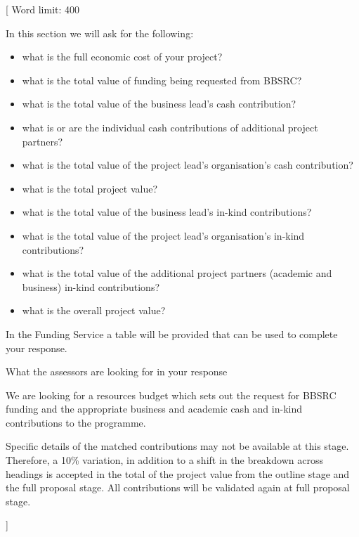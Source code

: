 \documentclass{article}
\newcommand{\desc}[1]{{\leavevmode\color{blue}[#1]}}
\begin{document}
\desc{
Word limit: 400

In this section we will ask for the following:

\begin{itemize}

    \item what is the full economic cost of your project?

    \item what is the total value of funding being requested from BBSRC?

    \item what is the total value of the business lead’s cash contribution?

    \item what is or are the individual cash contributions of additional project partners?

    \item what is the total value of the project lead’s organisation’s cash contribution?

    \item what is the total project value?

    \item what is the total value of the business lead’s in-kind contributions?

    \item what is the total value of the project lead’s organisation’s in-kind contributions?

    \item what is the total value of the additional project partners (academic and business) in-kind contributions?

    \item what is the overall project value?

\end{itemize}

In the Funding Service a table will be provided that can be used to complete
your response.

What the assessors are looking for in your response

We are looking for a resources budget which sets out the request for BBSRC
funding and the appropriate business and academic cash and in-kind
contributions
to the programme.

Specific details of the matched contributions may not be available at this
stage.  Therefore, a 10\% variation, in addition to a shift in the breakdown
across headings is accepted in the total of the project value from the outline
stage and the full proposal stage. All contributions will be validated again at
full proposal stage.

}
\end{document}
